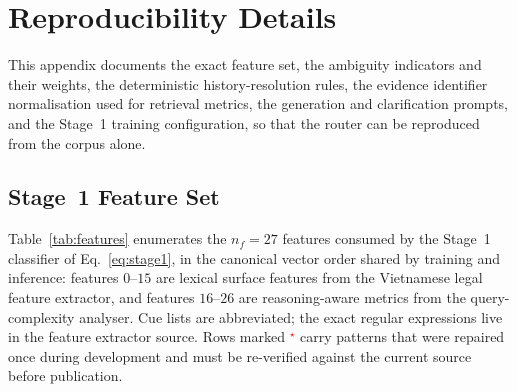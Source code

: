 \appendix

\section{Reproducibility Details}\label{app:repro}

This appendix documents the exact feature set, the ambiguity indicators and
their weights, the deterministic history-resolution rules, the evidence
identifier normalisation used for retrieval metrics, the generation and
clarification prompts, and the Stage~1 training configuration, so that the
router can be reproduced from the corpus alone.

\subsection{Stage~1 Feature Set}\label{app:features}

Table~\ref{tab:features} enumerates the $n_f=27$ features consumed by the
Stage~1 classifier of Eq.~\eqref{eq:stage1}, in the canonical vector order
shared by training and inference: features $0$--$15$ are lexical surface
features from the Vietnamese legal feature extractor, and features
$16$--$26$ are reasoning-aware metrics from the query-complexity analyser.
Cue lists are abbreviated; the exact regular expressions live in the feature
extractor source. Rows marked \textcolor{red}{$^{\star}$} carry patterns that
were repaired once during development and must be re-verified against the
current source before publication.

